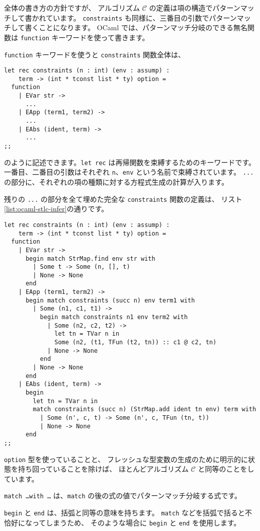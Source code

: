 全体の書き方の方針ですが、
アルゴリズム $\mathcal C$ の定義は項の構造でパターンマッチして書かれています。
\texttt{constraints} も同様に、三番目の引数でパターンマッチして書くことになります。
OCaml では、パターンマッチ分岐のできる無名関数は \texttt{function} キーワードを使って書きます。

\texttt{function} キーワードを使うと \texttt{constraints} 関数全体は、
\begin{lstlisting}
let rec constraints (n : int) (env : assump) :
    term -> (int * tconst list * ty) option =
  function
    | EVar str ->
      ...
    | EApp (term1, term2) ->
      ...
    | EAbs (ident, term) ->
      ...
;;
\end{lstlisting}
のように記述できます。\texttt{let rec} は再帰関数を束縛するためのキーワードです。
一番目、二番目の引数はそれぞれ \texttt{n}、\texttt{env} という名前で束縛されています。
\texttt{...} の部分に、それぞれの項の種類に対する方程式生成の計算が入ります。

残りの \texttt{...} の部分を全て埋めた完全な \texttt{constraints} 関数の定義は、
リスト\ref{list:ocaml-stlc-infer}の通りです。

\begin{lstlisting}[caption=方程式を生成する関数, label=list:ocaml-stlc-infer]
let rec constraints (n : int) (env : assump) :
    term -> (int * tconst list * ty) option =
  function
    | EVar str ->
      begin match StrMap.find env str with
        | Some t -> Some (n, [], t)
        | None -> None
      end
    | EApp (term1, term2) ->
      begin match constraints (succ n) env term1 with
        | Some (n1, c1, t1) ->
          begin match constraints n1 env term2 with
            | Some (n2, c2, t2) ->
              let tn = TVar n in
              Some (n2, (t1, TFun (t2, tn)) :: c1 @ c2, tn)
            | None -> None
          end
        | None -> None
      end
    | EAbs (ident, term) ->
      begin
        let tn = TVar n in
        match constraints (succ n) (StrMap.add ident tn env) term with
          | Some (n', c, t) -> Some (n', c, TFun (tn, t))
          | None -> None
      end
;;
\end{lstlisting}

\texttt{option} 型を使っていることと、
フレッシュな型変数の生成のために明示的に状態を持ち回っていることを除けば、
ほとんどアルゴリズム $\mathcal C$ と同等のことをしています。

\texttt{match \dots with \dots} は、\texttt{match} の後の式の値でパターンマッチ分岐する式です。

\texttt{begin} と \texttt{end} は、括弧と同等の意味を持ちます。
\texttt{match} などを括弧で括ると不恰好になってしまうため、
そのような場合に \texttt{begin} と \texttt{end} を使用します。

